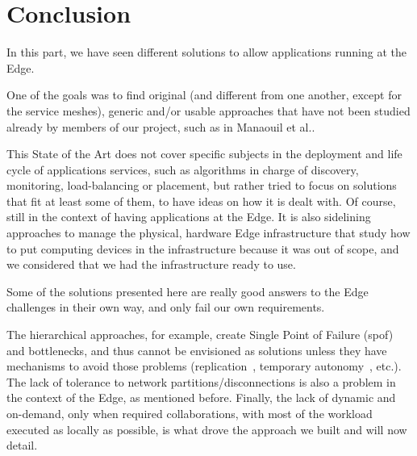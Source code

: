 \section{Conclusion }
\label{sec:soa-conclusion}

In this part, we have seen different solutions to allow applications
running at the Edge.

%
One of the goals was to find original (and different from one another,
except for the service meshes), generic and/or usable approaches that
have not been studied already by members of our project, such as in
Manaouil et al.\cite{ML20}.


%
This State of the Art does not cover specific subjects in the
deployment and life cycle of applications services, such as algorithms
in charge of discovery, monitoring, load-balancing or placement, but
rather tried to focus on solutions that fit at least some of them, to
have ideas on how it is dealt with.
%
Of course, still in the context of having applications at the
Edge.
%
It is also sidelining approaches to manage the physical, hardware Edge
infrastructure that study how to put computing devices in the
infrastructure because it was out of scope, and we considered that
we had the infrastructure ready to use.
%

%
Some of the solutions presented here are really good answers to the
Edge challenges in their own way, and only fail our own requirements.

%
The hierarchical approaches, for example, create Single Point of
Failure (\acrshort{spof}) and bottlenecks, and thus cannot be
envisioned as solutions unless they have mechanisms to avoid those
problems (replication~\cite{TSS21}, temporary autonomy~\cite{SS20},
etc.).
%
The lack of tolerance to network partitions/disconnections is also a
problem in the context of the Edge, as mentioned before.
%
Finally, the lack of dynamic and on-demand, only when required
collaborations, with most of the workload executed as locally as
possible, is what drove the approach we built and will now detail.

